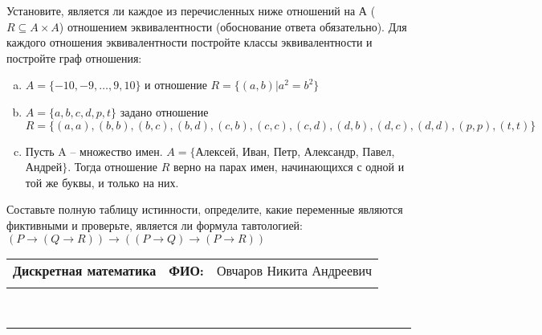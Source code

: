 \documentclass[10pt]{exam}
\newcommand{\class}{Дискретная математика}
\newcommand{\examdate}{}
\begin{document}
\begin{questions}
\question
Установите, является ли каждое из перечисленных ниже отношений на А ($R \subseteq A \times A$) отношением эквивалентности (обоснование ответа обязательно). Для каждого отношения эквивалентности постройте классы 
эквивалентности и постройте граф отношения:
\begin{enumerate} [a)]\setcounter{enumi}{0}
\item $A = \{-10, -9, … , 9, 10\}$ и отношение $R = \{(a,b)|a^{2} = b^{2}\}$
\item $A = \{a, b, c, d, p, t\}$ задано отношение $R = \{(a, a), (b, b), (b, c), (b, d), (c, b), (c, c), (c, d), (d, b), (d, c), (d, d), (p,p), (t,t)\}$
\item Пусть A – множество имен. $A = \{ $Алексей, Иван, Петр, Александр, Павел, Андрей$ \}$. Тогда отношение $R$ верно на парах имен, начинающихся с одной и той же буквы, и только на них.
\end{enumerate}\question Составьте полную таблицу истинности, определите, какие переменные являются фиктивными и проверьте, является ли формула тавтологией:
$(P \rightarrow (Q \rightarrow R)) \rightarrow ((P \rightarrow Q) \rightarrow (P \rightarrow R))$

\end{questions}
\newpage
\begin{flushright}
\begin{tabular}{p{2.8in} r l}
\textbf{\class} & \textbf{ФИО:} &Овчаров Никита Андреевич
\\

\textbf{\examdate} &&\\
\end{tabular}\\
\end{flushright}
\rule[1ex]{\textwidth}{.1pt}
\end{document}
